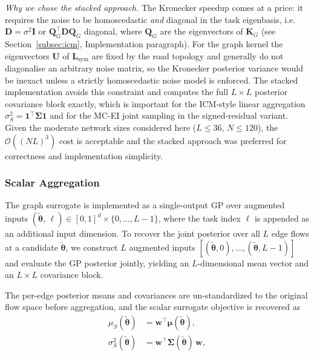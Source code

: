 \documentclass[11pt]{article}
\begin{document}
\emph{Why we chose the stacked approach.}
The Kronecker speedup comes at a price: it requires the noise to be
homoscedastic \emph{and} diagonal in the task eigenbasis, i.e.\
$\mathbf{D} = \sigma^2 \mathbf{I}$ or
$\mathbf{Q}_G^\top \mathbf{D} \mathbf{Q}_G$ diagonal, where
$\mathbf{Q}_G$ are the eigenvectors of $\mathbf{K}_G$
(see Section~\ref{subsec:icm}, Implementation paragraph). For the graph
kernel the eigenvectors $\mathbf{U}$ of $\mathbf{L}_{\mathrm{sym}}$ are
fixed by the road topology and generally do not diagonalise an
arbitrary noise matrix, so the Kronecker posterior variance would be
inexact unless a strictly homoscedastic noise model is enforced. The
stacked implementation avoids this constraint and computes the full
$L \times L$ posterior covariance block exactly, which is important for
the ICM-style linear aggregation $\sigma^2_S =
\mathbf{1}^\top \boldsymbol{\Sigma} \mathbf{1}$ and for the MC-EI
joint sampling in the signed-residual variant. Given the moderate
network sizes considered here ($L \leq 36$, $N \leq 120$), the
$\mathcal{O}((NL)^3)$ cost is acceptable and the stacked approach
was preferred for correctness and implementation simplicity.


\subsubsection{Scalar Aggregation}
\label{subsec:graph-aggregation}


The graph surrogate is implemented as a single-output GP over augmented
inputs $(\tilde{\boldsymbol{\theta}},\, \ell) \in [0,1]^d \times \{0,\dots,L-1\}$,
where the task index $\ell$ is appended as an additional input dimension.
To recover the joint posterior over all $L$ edge flows at a candidate
$\tilde{\boldsymbol{\theta}}$, we construct $L$ augmented inputs
$[(\tilde{\boldsymbol{\theta}}, 0), \dots, (\tilde{\boldsymbol{\theta}}, L-1)]$
and evaluate the GP posterior jointly, yielding an $L$-dimensional mean
vector and an $L \times L$ covariance block.

The per-edge posterior means and covariances are un-standardized to the
original flow space before aggregation, and the scalar surrogate objective
is recovered as
\begin{align}
    \mu_S(\tilde{\boldsymbol{\theta}})
        &= \mathbf{w}^\top \boldsymbol{\mu}(\tilde{\boldsymbol{\theta}}),
        \label{eq:graph-agg-mean} \\
    \sigma^2_S(\tilde{\boldsymbol{\theta}})
        &= \mathbf{w}^\top
           \boldsymbol{\Sigma}(\tilde{\boldsymbol{\theta}})\,
           \mathbf{w},
        \label{eq:graph-agg-var}
\end{align}
\end{document}

